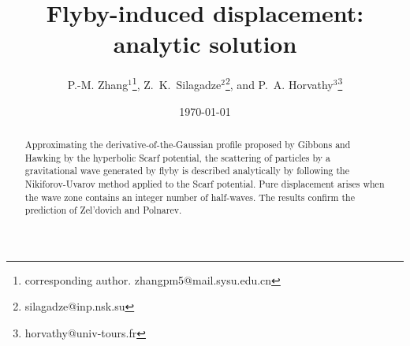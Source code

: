 \documentclass[preprint,showpacs,preprintnumbers,amsmath,amssymb,nofootinbib]{revtex4}
\newcommand{\yb}{\colorbox{yellow}}
\begin{document}



\title{Flyby-induced displacement: analytic solution}

\author{
P.-M. Zhang$^{1}$\footnote{corresponding author.  
 zhangpm5@mail.sysu.edu.cn},
Z.~K.~Silagadze$^{2}$\footnote{silagadze@inp.nsk.su},
and P.~A. Horvathy$^{3}$\footnote{horvathy@univ-tours.fr}
}

\date{\today}


\begin{abstract}
Approximating the derivative-of-the-Gaussian profile
proposed by Gibbons and Hawking by the hyperbolic Scarf potential, the scattering of particles by a gravitational wave generated by flyby is described analytically by following the Nikiforov-Uvarov method applied to the Scarf potential. Pure displacement arises when the wave zone contains an integer number of half-waves. The results confirm the prediction of Zel'dovich and Polnarev. %
\bigskip

\end{abstract}
\maketitle

\tableofcontents
\goodbreak


\end{document}
